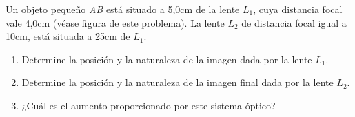 
Un objeto pequeño \textit{AB} está situado a 5,0cm de la lente \textit{$L_1$}, cuya distancia focal vale 4,0cm (véase figura de este problema). La lente \textit{$L_2$} de distancia focal igual a 10cm, está situada a 25cm de \textit{$L_1$}.
\begin{enumerate}
    \item Determine la posición y la naturaleza de la imagen dada por la lente \textit{$L_1$}.
    \item Determine la posición y la naturaleza de la imagen final dada por la lente \textit{$L_2$}.
    \item ¿Cuál es el aumento proporcionado por este sistema óptico?
\end{enumerate}